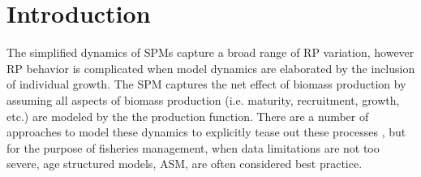 %
\newcommand{\kr}{ \frac{\kappa w_\infty}{w(a_s)} }
\newcommand{\one}{
        \left(\frac{Z(Z+\kappa)}{\alpha w(a_s)(Z+\kr)}\right)^\gamma
}
\newcommand{\two}{
        \left(\frac{\gamma F}{\alpha w(a_s)}\right) \left(\frac{Z(Z+\kappa)}{\alpha w(a_s)(Z+\kr)}\right)^{\gamma-1}
}
\newcommand{\thr}{
        \frac{\left(\kr\right)\left(\kappa-\kr\right)}{(Z+\kr)^2}
}
%
\newcommand{\oneA}{
        \left(\frac{Z^*(Z^*+\kappa)}{w(a_s)(Z^*+\kr)}\right)^\gamma
}
\newcommand{\twoA}{
        \left(\frac{\gamma F^*}{w(a_s)}\right) \left(\frac{Z^*(Z^*+\kappa)}{w(a_s)(Z^*+\kr)}\right)^{\gamma-1}
}
\newcommand{\thrA}{
        \frac{\left(\kr\right)\left(\kappa-\kr\right)}{(Z^*+\kr)^2}
}




%
\section{\color{red}Introduction}

%
The simplified dynamics of SPMs capture a broad range of RP variation, however
RP behavior is complicated when model dynamics are elaborated by the 
inclusion of individual growth. 
The SPM captures the net effect of biomass production by assuming all aspects 
of biomass production (i.e. maturity, recruitment, growth, etc.) are modeled by the %
the production function. There are a number of %
approaches to model these dynamics to explicitly tease out these processes \cite{quinn_quantitative_1999, hilborn_quantitative_1992}, 
but for the purpose of fisheries management, when data limitations are not too severe, %
age structured models, ASM, \cite{methot_stock_2013} are often considered best practice.

